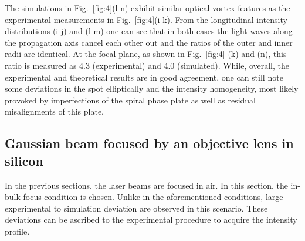 \documentclass[9pt,twocolumn,twoside]{osajnl}
\begin{document}
The simulations in Fig.~\ref{fig:4}(l-n) exhibit similar optical vortex features as the experimental measurements in Fig.~\ref{fig:4}(i-k). From the longitudinal intensity distributions (i-j) and (l-m) one can see that in both cases the light waves along the propagation axis cancel each other out and the ratios of the outer and inner radii are identical. At the focal plane, as shown in Fig.~\ref{fig:4} (k) and (n), this ratio is measured as 4.3 (experimental) and 4.0 (simulated). While, overall, the experimental and theoretical results are in good agreement, one can still note some deviations in the spot elliptically and the intensity homogeneity, most likely provoked by imperfections of the spiral phase plate as well as residual misalignments of this plate.

\subsection{Gaussian beam focused by an objective lens in silicon}
In the previous sections, the laser beams are focused in air. In this section, the in-bulk focus condition is chosen. Unlike in the aforementioned conditions, large experimental to simulation deviation are observed in this scenario. These deviations can be ascribed to the experimental procedure to acquire the intensity profile. 
\end{document}
